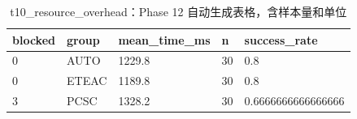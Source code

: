 \begin{table}[htbp]
\centering
\caption{t10_resource_overhead：Phase 12 自动生成表格，含样本量和单位}
\begin{tabular}{lllll}
\hline
blocked & group & mean_time_ms & n & success_rate \\
\hline
0 & AUTO & 1229.8 & 30 & 0.8 \\
0 & ETEAC & 1189.8 & 30 & 0.8 \\
3 & PCSC & 1328.2 & 30 & 0.6666666666666666 \\
\hline
\end{tabular}
\end{table}
